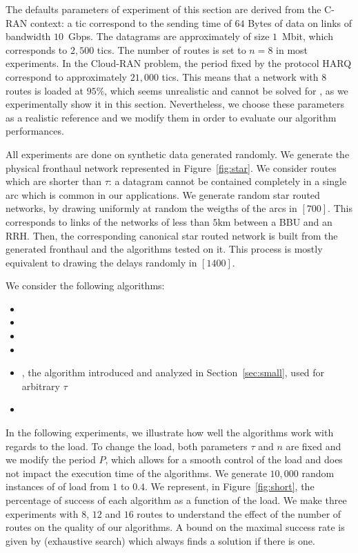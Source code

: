  The defaults parameters of experiment of this section are derived from the C-RAN context: a tic correspond to the sending time of $64$ Bytes of data on links of bandwidth $10$~Gbps. The datagrams are approximately of size $1$~Mbit, which corresponds to $2,500$ tics. The number of routes is set to $n = 8$ in most experiments. In the Cloud-RAN problem, the period fixed by the protocol HARQ correspond to approximately $21,000$ tics. This means that a network with $8$ routes is loaded at $95\%$, which seems unrealistic and cannot be solved for \pma, as we experimentally show it in this section. Nevertheless, we choose these parameters as a realistic reference and we modify them in order to evaluate our algorithm performances.

     All experiments are done on synthetic data generated randomly. We generate the physical fronthaul
     network represented in Figure~\ref{fig:star}. We consider routes which are shorter than $\tau$: a datagram cannot be contained completely in a single arc which is common in our applications. We generate random star routed networks, by drawing uniformly at random the weigths of the arcs in $[700]$. This corresponds to links of the networks of less than $5$km between a BBU and an RRH. Then, the corresponding canonical star routed network is built from the generated fronthaul and the algorithms tested on it. This process is mostly equivalent to drawing the delays randomly in $[1400]$.

     We consider the following algorithms:
\begin{itemize}
  \item \firstfit
  \item \metaoffset
  \item \compactpair
  \item \compactfit
  \item \greedyuniform, the algorithm introduced and analyzed in Section~\ref{sec:small}, used for arbitrary $\tau$
  \item \exactresolution 
\end{itemize}


     In the following experiments, we illustrate how well the algorithms work with regards to the load. To change the load, both parameters $\tau$ and $n$ are fixed and we modify the period $P$, which allows for a smooth control of the load and does not impact the execution time of the algorithms.
	   We generate $10,000$ random instances of \pma of load from $1$ to $0.4$. We represent, in Figure~\ref{fig:short}, the percentage of success of each algorithm as a function of the load. We make three experiments with $8$, $12$ and $16$ routes to understand the effect of the number of routes on the quality of our algorithms. A bound on the maximal success rate is given by \ESCA (exhaustive search) which always finds a solution if there is one. 

